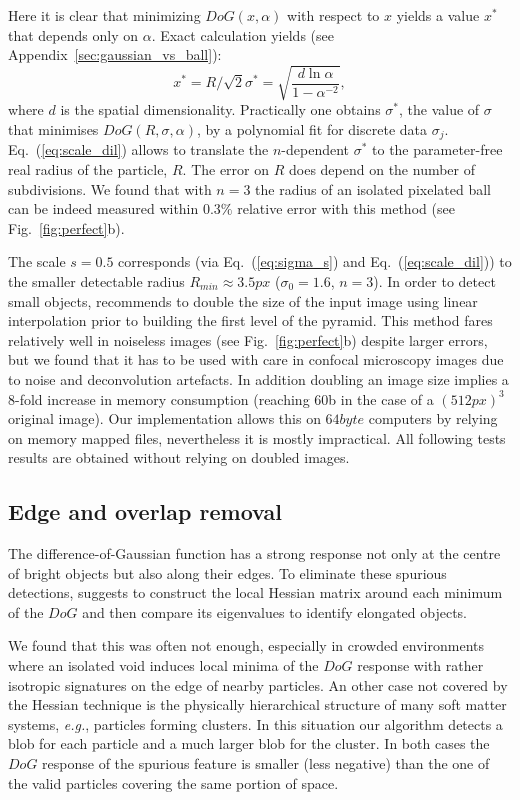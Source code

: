\documentclass[8.5pt,twoside,twocolumn]{article}
\begin{document}
Here it is clear that minimizing $DoG(x, \alpha)$ with respect to $x$ yields a value $x^*$ that depends only on $\alpha$. Exact calculation yields (see Appendix~\ref{sec:gaussian_vs_ball}):
\begin{equation}
	x^* = R/\sqrt{2}\sigma^* = \sqrt{\frac{d\ln \alpha}{1-\alpha^{-2}}}, 
	\label{eq:scale_dil}
\end{equation}
where $d$ is the spatial dimensionality. 
Practically one obtains $\sigma^*$, the value of $\sigma$ that minimises $DoG(R,\sigma, \alpha)$, by a polynomial fit for discrete data $\sigma_j$. Eq.~(\ref{eq:scale_dil}) allows to translate the $n$-dependent $\sigma^*$ to the parameter-free real radius of the particle, $R$. The error on $R$ does depend on the number of subdivisions. We found that with $n=3$ the radius of an isolated pixelated ball can be indeed measured within $0.3\%$ relative error with this method (see Fig.~\ref{fig:perfect}b).

The scale $s=0.5$ corresponds (via Eq.~(\ref{eq:sigma_s}) and Eq.~(\ref{eq:scale_dil})) to the smaller detectable radius $R_{min}\approx \unit{3.5}{px}$ ($\sigma_0=1.6$, $n=3$). In order to detect small objects, \citet{Lowe2004} recommends to double the size of the input image using linear interpolation prior to building the first level of the pyramid. This method fares relatively well in noiseless images (see Fig.~\ref{fig:perfect}b) despite larger errors, but we found that it has to be used with care in confocal microscopy images due to noise and deconvolution artefacts. In addition doubling an image size implies a 8-fold increase in memory consumption (reaching \unit{60}{\giga b} in the case of a $(\unit{512}{px})^3$ original image). Our implementation allows this on $\unit{64}{byte}$ computers by relying on memory mapped files, nevertheless it is mostly impractical. All following tests results are obtained without relying on doubled images.

\subsection{Edge and overlap removal}

The difference-of-Gaussian function has a strong response not only at the centre of bright objects but also along their edges. To eliminate these spurious detections, \citet{Lowe2004} suggests to construct the local Hessian matrix around each minimum of the $DoG$ and then compare its eigenvalues to identify elongated objects.

We found that this was often not enough, especially in crowded environments where an isolated void induces local minima of the $DoG$ response with rather isotropic signatures on the edge of nearby particles. An other case not covered by the Hessian technique is the physically hierarchical structure of many soft matter systems, \emph{e.g.}, particles forming clusters. In this situation our algorithm detects a blob for each particle and a much larger blob for the cluster. In both cases the $DoG$ response of the spurious feature is smaller (less negative) than the one of the valid particles covering the same portion of space. 
\end{document}
